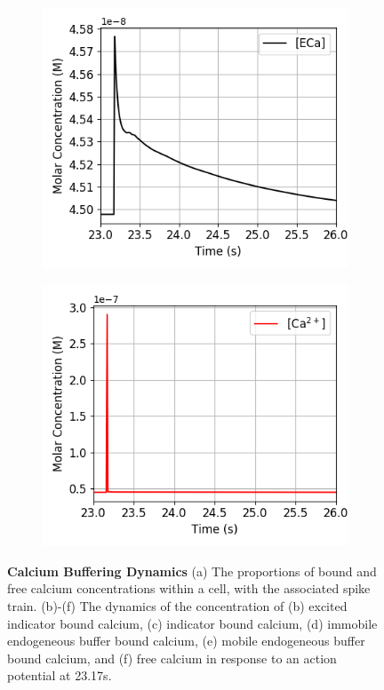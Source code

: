 \documentclass[a4paper,12pt]{article}
\theoremstyle{definition}
\begin{document}
\begin{figure}
\begin{subfigure}{0.5\textwidth}
    \includegraphics[width=\textwidth]{figures/concentration_dynamics_18_zoomed_ECa.png}
    \caption{}
  \end{subfigure}
  \begin{subfigure}{0.5\textwidth}
    \includegraphics[width=\textwidth]{figures/concentration_dynamics_18_zoomed_Ca.png}
    \caption{}
  \end{subfigure}
  \caption{\textbf{Calcium Buffering Dynamics } (a) The proportions of bound and free calcium concentrations within a cell, with the associated spike train. (b)-(f) The dynamics of the concentration of (b) excited indicator bound calcium, (c) indicator bound calcium, (d) immobile endogeneous buffer bound calcium, (e) mobile endogeneous buffer bound calcium, and (f) free calcium in response to an action potential at 23.17s.}
  \label{fig:concentrations}
\end{figure}
\end{document}
